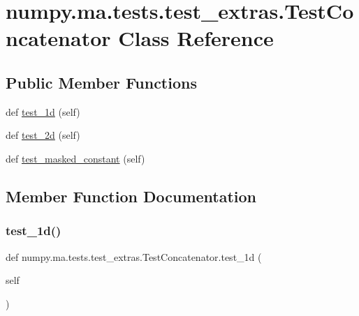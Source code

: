 \hypertarget{classnumpy_1_1ma_1_1tests_1_1test__extras_1_1TestConcatenator}{}\section{numpy.\+ma.\+tests.\+test\+\_\+extras.\+Test\+Concatenator Class Reference}
\label{classnumpy_1_1ma_1_1tests_1_1test__extras_1_1TestConcatenator}
\subsection*{Public Member Functions}
\begin{DoxyCompactItemize}
\item 
def \hyperlink{classnumpy_1_1ma_1_1tests_1_1test__extras_1_1TestConcatenator_a5ef32f3d5fdf57d875d8d326b2ce7276}{test\+\_\+1d} (self)
\item 
def \hyperlink{classnumpy_1_1ma_1_1tests_1_1test__extras_1_1TestConcatenator_addd9f6b7c4b11dca9ea65c81122c84f9}{test\+\_\+2d} (self)
\item 
def \hyperlink{classnumpy_1_1ma_1_1tests_1_1test__extras_1_1TestConcatenator_a376762a832c5ce91761a3f45cf08e372}{test\+\_\+masked\+\_\+constant} (self)
\end{DoxyCompactItemize}


\subsection{Member Function Documentation}
\mbox{\label{classnumpy_1_1ma_1_1tests_1_1test__extras_1_1TestConcatenator_a5ef32f3d5fdf57d875d8d326b2ce7276}} 
\subsubsection{\texorpdfstring{test\+\_\+1d()}{test\_1d()}}
{\footnotesize\ttfamily def numpy.\+ma.\+tests.\+test\+\_\+extras.\+Test\+Concatenator.\+test\+\_\+1d (\begin{DoxyParamCaption}\item[{}]{self }\end{DoxyParamCaption})}

